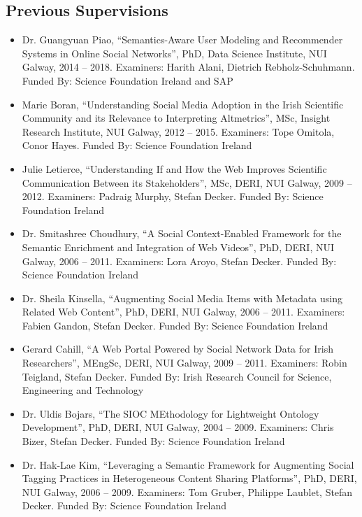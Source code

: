 \documentclass[10pt,a4paper]{res} %
\begin{document}
\begin{resume}
\subsection*{Previous Supervisions}

\begin{itemize} \itemsep -2pt
\item Dr. Guangyuan Piao, ``Semantics-Aware User Modeling and Recommender Systems in Online Social Networks'', PhD, Data Science Institute, NUI Galway, 2014 -- 2018. Examiners: Harith Alani, Dietrich Rebholz-Schuhmann. Funded By: Science Foundation Ireland and SAP %
\item Marie Boran, ``Understanding Social Media Adoption in the Irish Scientific Community and its Relevance to Interpreting Altmetrics'', MSc, Insight Research Institute, NUI Galway, 2012 -- 2015. Examiners: Tope Omitola, Conor Hayes. Funded By: Science Foundation Ireland
\item Julie Letierce, ``Understanding If and How the Web Improves Scientific Communication Between its Stakeholders'', MSc, DERI, NUI Galway, 2009 -- 2012. Examiners: Padraig Murphy, Stefan Decker. Funded By: Science Foundation Ireland
\item Dr. Smitashree Choudhury, ``A Social Context-Enabled Framework for the Semantic Enrichment and Integration of Web Videos'', PhD, DERI, NUI Galway, 2006 -- 2011. Examiners: Lora Aroyo, Stefan Decker. Funded By: Science Foundation Ireland %
\item Dr. Sheila Kinsella, ``Augmenting Social Media Items with Metadata using Related Web Content'', PhD, DERI, NUI Galway, 2006 -- 2011. Examiners: Fabien Gandon, Stefan Decker. Funded By: Science Foundation Ireland %
\item Gerard Cahill, ``A Web Portal Powered by Social Network Data for Irish Researchers'', MEngSc, DERI, NUI Galway, 2009 -- 2011. Examiners: Robin Teigland, Stefan Decker. Funded By: Irish Research Council for Science, Engineering and Technology
\item Dr. Uldis Bojars, ``The SIOC MEthodology for Lightweight Ontology Development'', PhD, DERI, NUI Galway, 2004 -- 2009. Examiners: Chris Bizer, Stefan Decker. Funded By: Science Foundation Ireland %
\item Dr. Hak-Lae Kim, ``Leveraging a Semantic Framework for Augmenting Social Tagging Practices in Heterogeneous Content Sharing Platforms'', PhD, DERI, NUI Galway, 2006 -- 2009. Examiners: Tom Gruber, Philippe Laublet, Stefan Decker. Funded By: Science Foundation Ireland %
\end{itemize}


\end{resume}
\end{document}
